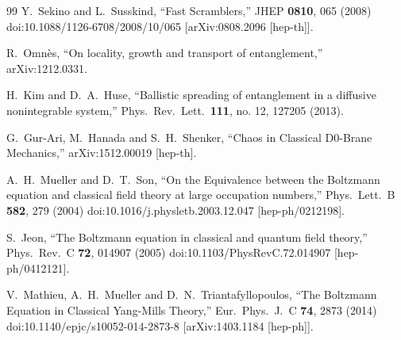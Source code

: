 \documentclass[12pt]{article}
\begin{document}
\begin{thebibliography}{99}
  Y.~Sekino and L.~Susskind,
  ``Fast Scramblers,''
  JHEP {\bf 0810}, 065 (2008)
  doi:10.1088/1126-6708/2008/10/065
  [arXiv:0808.2096 [hep-th]].

  R.~Omn{\`e}s,
``On locality, growth and transport of entanglement,'' arXiv:1212.0331.


H.~Kim and D.~A.~Huse,
``Ballistic spreading of entanglement in a diffusive nonintegrable system,''
	Phys.\ Rev.\ Lett.\  {\bf 111}, no. 12, 127205 (2013).

  G.~Gur-Ari, M.~Hanada and S.~H.~Shenker,
  ``Chaos in Classical D0-Brane Mechanics,''
  arXiv:1512.00019 [hep-th].
  
  

  A.~H.~Mueller and D.~T.~Son,
  ``On the Equivalence between the Boltzmann equation and classical field theory at large occupation numbers,''
  Phys.\ Lett.\ B {\bf 582}, 279 (2004)
  doi:10.1016/j.physletb.2003.12.047
  [hep-ph/0212198].

  S.~Jeon,
  ``The Boltzmann equation in classical and quantum field theory,''
  Phys.\ Rev.\ C {\bf 72}, 014907 (2005)
  doi:10.1103/PhysRevC.72.014907
  [hep-ph/0412121].


  V.~Mathieu, A.~H.~Mueller and D.~N.~Triantafyllopoulos,
  ``The Boltzmann Equation in Classical Yang-Mills Theory,''
  Eur.\ Phys.\ J.\ C {\bf 74}, 2873 (2014)
  doi:10.1140/epjc/s10052-014-2873-8
  [arXiv:1403.1184 [hep-ph]].
  
  



\end{thebibliography}


%  
% 
\end{document}
